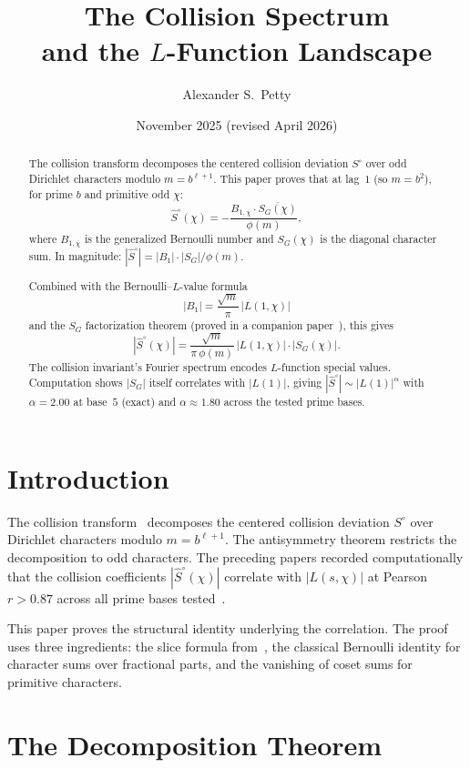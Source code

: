\documentclass[12pt]{amsart}
\title{The Collision Spectrum\\and the $L$-Function Landscape}
\author{Alexander S.\ Petty}
\date{November 2025 (revised April 2026)}
\theoremstyle{definition}
\theoremstyle{remark}
\begin{document}
\begin{abstract}
The collision transform decomposes the centered
collision deviation $S^{\circ}$ over odd Dirichlet
characters modulo $m = b^{\ell+1}$. This paper proves
that at lag~$1$ (so $m=b^2$), for prime $b$ and
primitive odd $\chi$:
\[
\hat{S}^{\circ}(\chi)
= -\frac{B_{1,\overline{\chi}} \cdot
\overline{S_G(\chi)}}{\phi(m)},
\]
where $B_{1,\overline{\chi}}$ is the generalized
Bernoulli number and $S_G(\chi)$ is the diagonal
character sum. In magnitude:
$|\hat{S}^{\circ}| = |B_1| \cdot |S_G| / \phi(m)$.

Combined with the Bernoulli--$L$-value formula
\[
|B_1| = \frac{\sqrt{m}}{\pi}\,|L(1,\chi)|
\]
and the $S_G$ factorization theorem (proved in
a companion paper~\cite{paperC}), this gives
\[
|\hat{S}^{\circ}(\chi)|
= \frac{\sqrt{m}}{\pi\,\phi(m)}\,
|L(1, \chi)| \cdot |S_G(\chi)|.
\]
The collision invariant's Fourier spectrum encodes
$L$-function special values. Computation shows
$|S_G|$ itself correlates with $|L(1)|$, giving
$|\hat{S}^{\circ}| \sim |L(1)|^{\alpha}$ with
$\alpha = 2.00$ at base~$5$ (exact) and
$\alpha \approx 1.80$ across the tested prime bases.
\end{abstract}
\maketitle

\section{Introduction}

The collision transform~\cite{paperB} decomposes the
centered collision deviation $S^{\circ}$ over Dirichlet
characters modulo $m = b^{\ell+1}$. The antisymmetry
theorem restricts the decomposition to odd characters.
The preceding papers recorded computationally that the collision
coefficients $|\hat{S}^{\circ}(\chi)|$ correlate with
$|L(s, \chi)|$ at Pearson $r > 0.87$ across all
prime bases tested~\cite{paper19,paper20}.

This paper proves the structural identity underlying
the correlation. The proof uses three ingredients: the
slice formula from~\cite{paperA}, the classical
Bernoulli identity for character sums over fractional
parts, and the vanishing of coset sums for primitive
characters.

\section{The Decomposition Theorem}
\end{document}
